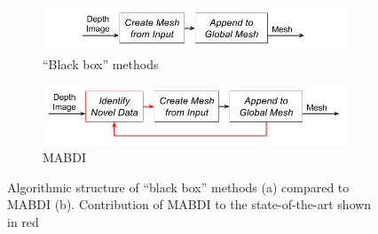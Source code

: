 \begin{figure}[h]%
\centering
\begin{subfigure}[t]{\textwidth}
  \includegraphics[width=.9\textwidth]
    {figures/diagram_general_pipeline_blackbox.png}
  \caption{``Black box'' methods}
  \label{fig:pipeline_blackbox}
\end{subfigure}
\begin{subfigure}[b]{\textwidth}
  \includegraphics[width=.9\textwidth]
    {figures/diagram_general_pipeline_mabdi.png}
  \caption{MABDI}
  \label{fig:pipeline_mabdi}
\end{subfigure}
\caption{Algorithmic structure of ``black box'' methods (a) compared to MABDI
(b). Contribution of MABDI to the state-of-the-art shown in red}
\label{fig:pipeline}
\end{figure}
